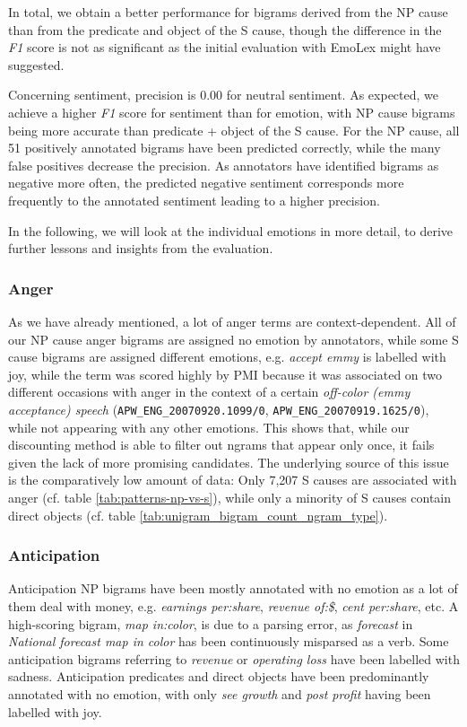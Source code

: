 In total, we obtain a better performance for bigrams derived from the NP cause than from the predicate and object of the S cause, though the difference in the \textit{F1} score is not as significant as the initial evaluation with EmoLex might have suggested.

Concerning sentiment, precision is 0.00 for neutral sentiment. As expected, we achieve a higher \textit{F1} score for sentiment than for emotion, with NP cause bigrams being more accurate than predicate + object of the S cause. For the NP cause, all 51 positively annotated bigrams have been predicted correctly, while the many false positives decrease the precision. As annotators have identified bigrams as negative more often, the predicted negative sentiment corresponds more frequently to the annotated sentiment leading to a higher precision.

In the following, we will look at the individual emotions in more detail, to derive further lessons and insights from the evaluation.

\subsubsection{Anger}

As we have already mentioned, a lot of anger terms are context-dependent. All of our NP cause anger bigrams are assigned no emotion by annotators, while some S cause bigrams are assigned different emotions, e.g. \textit{accept emmy} is labelled with joy, while the term was scored highly by PMI because it was associated on two different occasions with anger in the context of a certain \textit{off-color (emmy acceptance) speech} (\texttt{APW\_ENG\_20070920.1099/0}, \texttt{APW\_ENG\_20070919.1625/0}), while not appearing with any other emotions. This shows that, while our discounting method is able to filter out ngrams that appear only once, it fails given the lack of more promising candidates. The underlying source of this issue is the comparatively low amount of data: Only 7,207 S causes are associated with anger (cf. table \ref{tab:patterns-np-vs-s}), while only a minority of S causes contain direct objects (cf. table \ref{tab:unigram_bigram_count_ngram_type}).

\subsubsection{Anticipation}

Anticipation NP bigrams have been mostly annotated with no emotion as a lot of them deal with money, e.g. \textit{earnings per:share}, \textit{revenue of:\$}, \textit{cent per:share}, etc. A high-scoring bigram, \textit{map in:color}, is due to a parsing error, as \textit{forecast} in \textit{National forecast map in color} has been continuously misparsed as a verb. Some anticipation bigrams referring to \textit{revenue} or \textit{operating loss} have been labelled with sadness. Anticipation predicates and direct objects have been predominantly annotated with no emotion, with only \textit{see growth} and \textit{post profit} having been labelled with joy.


